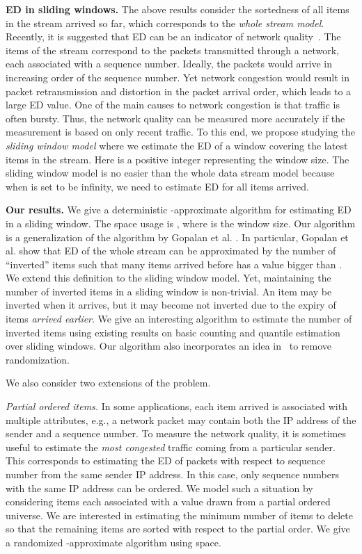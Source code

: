 \documentclass{llncs}
\newcommand{\runtitle}[1]{{\small \textbf{\boldmath #1}}}
\begin{document}
\runtitle{ED in sliding windows.}
The above results consider the sortedness of all items in the stream
arrived so far, which corresponds to the \emph{whole stream model}.
Recently, it is suggested that ED can be an indicator of
network quality~\cite{GKT10}. The items of the stream correspond to
the packets transmitted through a network,
each associated with a sequence number. Ideally, the
packets would arrive in increasing order of the sequence number.
Yet network congestion would result in packet retransmission
and distortion in the packet arrival order, which leads
to a large ED value.
One of the main causes to network congestion is
that traffic is often bursty.
Thus, the network quality can be measured more accurately
if the measurement is based on only recent traffic.
To this end, we propose studying the \emph{sliding window model} where
we estimate the ED of a window covering the latest  items in the stream.
Here  is a positive integer representing the window size.
The sliding window model is no easier than the whole data stream model because
when  is set to be infinity, we need to estimate
ED for all items arrived.

\runtitle{Our results.}
We give a deterministic -approximate algorithm
for estimating ED in a sliding window. The space usage is
, where  is
the window size.
Our algorithm is a generalization
of the algorithm by Gopalan et al. \cite{GJK+07}.
In particular, Gopalan et al. show that ED of the whole stream
can be approximated by the number of ``inverted'' items  such that many items
arrived before  has a value bigger than .
We extend this definition
to the sliding window model. Yet, maintaining the number
of inverted items in a sliding window is non-trivial.
An item  may be inverted when it arrives, but it may
become not inverted due to the expiry of items \emph{arrived earlier}.
We give an interesting algorithm to estimate the number of inverted items
using existing results
on basic counting and quantile estimation over sliding windows.
Our algorithm also incorporates an idea in~\cite{ErJ08}
to remove randomization.

We also consider two extensions of the problem.

{\it  Partial ordered items.}
In some applications, each item arrived is associated
with multiple attributes, e.g., a network packet may contain
both the IP address of the sender and a sequence number.
To measure the network quality,
it is sometimes useful to estimate the \emph{most congested} traffic
coming from a particular sender.
This corresponds to estimating the ED of packets
with respect to sequence number from the same sender IP address.
In this case,
only sequence numbers with the same IP address can be ordered.
We model such a situation by considering items
each associated with a value drawn from a partial ordered universe.
We are interested in estimating the minimum number of
items to delete so that the remaining items are sorted
with respect to the partial order. We give a randomized -approximate algorithm
using  space.
\end{document}
